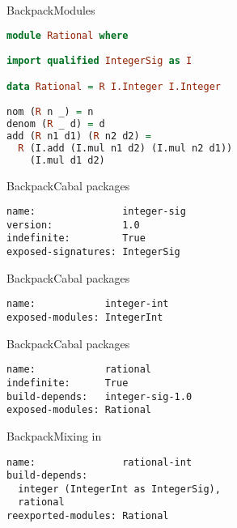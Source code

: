 \documentclass{beamer}
\begin{document}
\begin{frame}[fragile]{Backpack}{Modules}
\begin{lstlisting}[language=Haskell]
module Rational where

import qualified IntegerSig as I

data Rational = R I.Integer I.Integer

nom (R n _) = n
denom (R _ d) = d
add (R n1 d1) (R n2 d2) =
  R (I.add (I.mul n1 d2) (I.mul n2 d1))
    (I.mul d1 d2)
\end{lstlisting}
\end{frame}

\begin{frame}[fragile]{Backpack}{Cabal packages}
\begin{lstlisting}[title=Integer signature package]
name:               integer-sig
version:            1.0
indefinite:         True
exposed-signatures: IntegerSig
\end{lstlisting}
\end{frame}

\begin{frame}[fragile]{Backpack}{Cabal packages}
\begin{lstlisting}[title=Integer implementation package]
name:            integer-int
exposed-modules: IntegerInt
\end{lstlisting}
\end{frame}

\begin{frame}[fragile]{Backpack}{Cabal packages}
\begin{lstlisting}[title=Rational ``functor'' package]
name:            rational
indefinite:      True
build-depends:   integer-sig-1.0
exposed-modules: Rational
\end{lstlisting}
\end{frame}

\begin{frame}[fragile]{Backpack}{Mixing in}
\begin{lstlisting}[title=Rationals based on Integers]
name:               rational-int
build-depends:
  integer (IntegerInt as IntegerSig),
  rational
reexported-modules: Rational
\end{lstlisting}
\end{frame}
\end{document}
